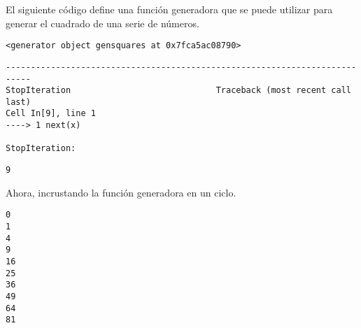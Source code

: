 \begin{code}
El siguiente código define una función generadora que
se puede utilizar para generar el cuadrado de una serie de números.

\begin{Shaded}
\begin{Highlighting}[]
     
        \OperatorTok{**}
\end{Highlighting}
\end{Shaded}

\begin{Shaded}
\begin{Highlighting}[]
\OperatorTok{=}\NormalTok{)}
\end{Highlighting}
\end{Shaded}

\begin{verbatim}
<generator object gensquares at 0x7fca5ac08790>
\end{verbatim}

\begin{Shaded}
\begin{Highlighting}[]
\end{Highlighting}
\end{Shaded}

\begin{verbatim}
---------------------------------------------------------------------------
StopIteration                             Traceback (most recent call last)
Cell In[9], line 1
----> 1 next(x)

StopIteration: 
\end{verbatim}

\begin{Shaded}
\begin{Highlighting}[]
\end{Highlighting}
\end{Shaded}

\begin{verbatim}
9

\end{verbatim}
\end{code}

\begin{code} Ahora, incrustando la función generadora en un ciclo.

\begin{Shaded}
\begin{Highlighting}[]
\NormalTok{):}
\end{Highlighting}
\end{Shaded}

\begin{verbatim}
0
1
4
9
16
25
36
49
64
81

\end{verbatim}
\end{code}

